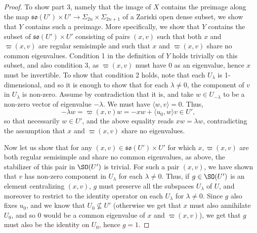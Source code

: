 \documentclass[11pt]{article}
\begin{document}
\begin{proof}
    To show part 3, namely that the image of $X$ contains the preimage along the map $\mathfrak{so}(U')\times U'\to \Sigma_{2n}\times \Sigma_{2n+1}$ of a Zariski open dense subset, we show that $Y$ contains such a preimage.
    More specifically, we show that $Y$ contains the subset of $\mathfrak{so}(U')\times U'$ consisting of pairs $(x, v)$ such that both $x$ and $\varpi(x, v)$ are regular semisimple and such that $x$ and $\varpi(x, v)$ share no common eigenvalues.
    Condition 1  in the definition of $Y$ holds trivially on this subset, and also condition 3, as $\varpi(x, v)$ must have $0$ as an eigenvalue, hence $x$ must be invertible.
    To show that condition 2 holds, note that each $U_\lambda$ is 1-dimensional, and so it is enough to show that for each $\lambda\neq 0$, the component of $v$ in $U_\lambda$ is non-zero. Assume by contradiction that it is, and take $w\in U_{-\lambda}$ to be a non-zero vector of eigenvalue $-\lambda$. We must have $\langle w, v\rangle = 0$.
    Thus,
    $$-\lambda w = \varpi(x, v) w = -xw + \langle u_0, w \rangle v\in U',$$
    so that necessarily $w\in U'$, and the above equality reads $xw = \lambda w$, contradicting the assumption that $x$ and $\varpi(x, v)$ share no eigenvalues.

    Now let us show that for any $(x,v)\in \mathfrak{so}(U')\times U'$ for which $x,\varpi(x,v)$ are both regular semisimple and share no common eigenvalues, as above, the stabilizer of this pair in $\SO(U')$ is trivial. For such a pair $(x,v)$, we have shown that $v$ has non-zero component in $U_\lambda$ for each $\lambda\neq 0$. Thus, if $g\in \SO(U')$ is an element centralizing $(x, v)$, $g$ must preserve all the subspaces $U_\lambda$ of $U$, and moreover to restrict to the identity operator on each $U_\lambda$ for $\lambda\neq 0$. Since $g$ also fixes $u_0$, and we know that $U_0\nsubseteq U'$ (otherwise we get that $x$ must also annihilate $U_0$, and so $0$ would be a common eigenvalue of $x$ and $\varpi(x, v)$), we get that $g$ must also be the identity on $U_0$, hence $g=1$.
\end{proof}
\end{document}
